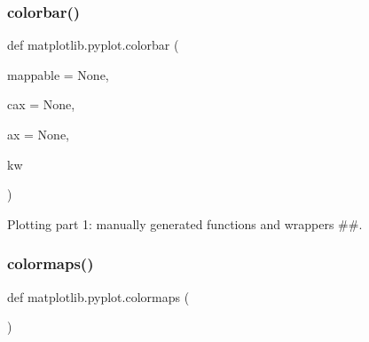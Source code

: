 \subsubsection{\texorpdfstring{colorbar()}{colorbar()}}
{\footnotesize\ttfamily def matplotlib.\+pyplot.\+colorbar (\begin{DoxyParamCaption}\item[{}]{mappable = {\ttfamily None},  }\item[{}]{cax = {\ttfamily None},  }\item[{}]{ax = {\ttfamily None},  }\item[{}]{kw }\end{DoxyParamCaption})}



Plotting part 1\+: manually generated functions and wrappers \#\#. 

\mbox{\label{namespacematplotlib_1_1pyplot_a83bb799a13540630c70ef40db0f182af}} 
\subsubsection{\texorpdfstring{colormaps()}{colormaps()}}
{\footnotesize\ttfamily def matplotlib.\+pyplot.\+colormaps (\begin{DoxyParamCaption}{ }\end{DoxyParamCaption})}

